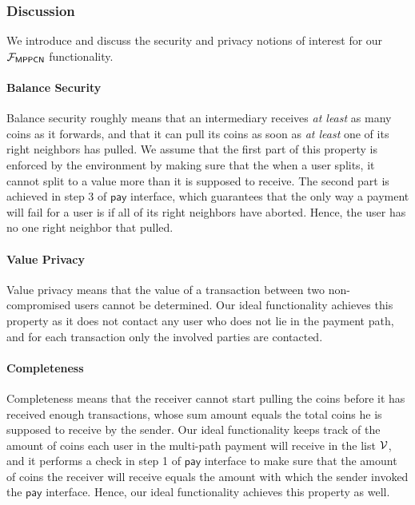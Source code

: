 \subsubsection{Discussion}
\label{sec:mppcn-discussion}

We introduce and discuss the security and privacy notions of interest for our 
$\mathcal{F}_{\mathsf{MPPCN}}$ functionality.

\paragraph{Balance Security}
Balance security roughly means that an intermediary receives \emph{at least} as many coins as 
it forwards, and that it can pull its coins as soon as \emph{at least} one of its right 
neighbors has pulled. We assume that the first part of this property is enforced by the 
environment by making sure that the when a user splits, it cannot split to a value more than it 
is supposed to receive.  The second part is achieved 
in step 3 of $\mathsf{pay}$ interface, which guarantees that the only way a payment will fail 
for a user is if all of its right neighbors have aborted. Hence, the user has no one right 
neighbor that pulled.

\paragraph{Value Privacy}
Value privacy means that the value of a transaction between two non-compromised users cannot 
be determined. Our ideal functionality achieves this property as it does not contact any user 
who does not lie in the payment path, and for each transaction only the involved parties are 
contacted. 


\paragraph{Completeness}
Completeness means that the receiver cannot start pulling the coins before it has received 
enough transactions, whose sum amount equals the total coins he is supposed to receive by 
the sender. Our ideal functionality keeps track of the amount of coins each user in the 
multi-path payment will receive in the list $\mathcal{V}$, and it performs a check in step 1 of 
$\mathsf{pay}$ interface to make sure that the amount of coins the receiver will receive equals 
the amount with which the sender invoked the $\mathsf{pay}$ interface. Hence, our ideal 
functionality achieves this property as well.

